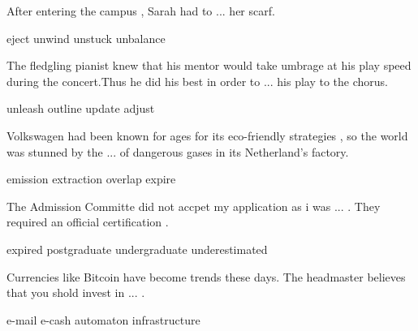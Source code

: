 \documentclass{exam}
\begin{document}
\begin{questions}
\question After entering the campus , Sarah had to ...  her scarf.\\
\begin{oneparchoices}
\choice eject
\correctchoice unwind
\choice unstuck
\choice unbalance
\end{oneparchoices}

\question The fledgling pianist knew that his mentor would take umbrage at his play speed during the concert.Thus he did his best in order to ... his play to the chorus.\\
\begin{oneparchoices}
\choice unleash
\choice outline
\choice update
\correctchoice adjust
\end{oneparchoices}



\question  Volkswagen had been known for ages for its eco-friendly strategies , so the world was stunned by the ... of dangerous gases in its Netherland's factory.\\
\begin{oneparchoices}
\correctchoice emission
\choice extraction
\choice overlap
\choice expire
\end{oneparchoices}



\question The Admission Committe did not accpet my application as i was ... . They required an official certification . \\
\begin{oneparchoices}
\choice expired
\choice postgraduate
\correctchoice undergraduate
\choice underestimated
\end{oneparchoices}



\question Currencies like Bitcoin have become trends these days. The headmaster believes that you shold invest in ... .\\
\begin{oneparchoices}
\choice e-mail
\correctchoice e-cash
\choice automaton
\choice infrastructure

\end{oneparchoices}
\end{questions}
\end{document}
